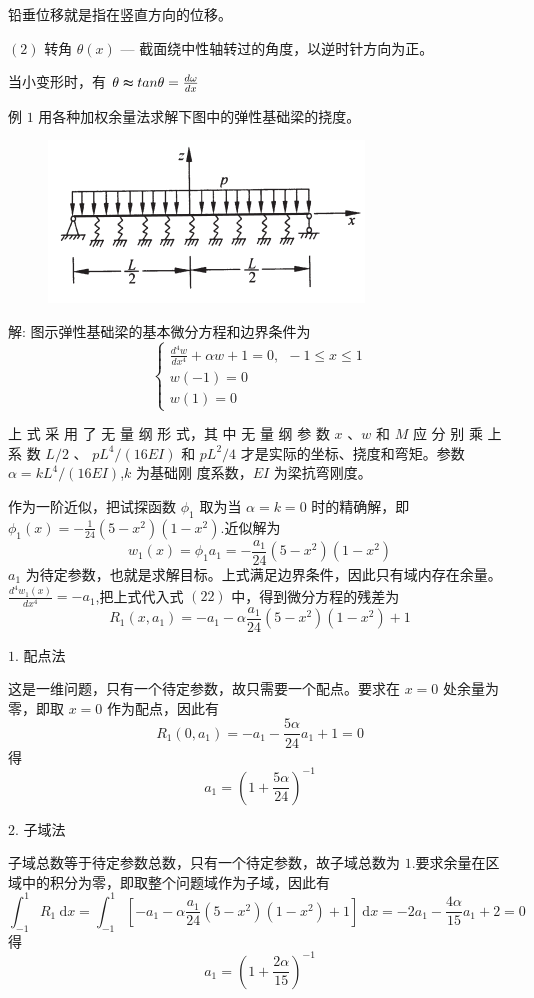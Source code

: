 \documentclass[12pt,a4paper]{article}
\begin{document}
铅垂位移就是指在竖直方向的位移。

$(2)$ 转角 $\theta(x)$ — 截面绕中性轴转过的角度，以逆时针方向为正。

当小变形时，有 $\theta\thickapprox tan\theta =\frac{d\omega}{dx}$

例 $1$ 用各种加权余量法求解下图中的弹性基础梁的挠度。
\begin{figure}[H]
\centering
\includegraphics[scale=0.6]{./figures/1.png}
\caption{}
\end{figure}

解: 图示弹性基础梁的基本微分方程和边界条件为
\begin{equation}
\begin{cases}
\frac{d^4w}{dx^4}+\alpha w+1=0,~~-1\leqslant x\leqslant 1 \\
w(-1)=0 \\
w(1)=0
\end{cases}
\end{equation}

上 式 采 用 了 无 量 纲 形 式，其 中 无 量 纲 参 数 $x$ 、$w$ 和 $M$ 应 分 别 乘 上 系 数 $L/2$ 、
$pL^4/(16EI)$ 和 $pL^2/4$ 才是实际的坐标、挠度和弯矩。参数 $\alpha = kL^4/(16EI)$,$k$ 为基础刚
度系数，$EI$ 为梁抗弯刚度。

作为一阶近似，把试探函数 $\phi_1$ 取为当 $\alpha = k = 0$ 时的精确解，即 $\phi_1(x)= −\frac{1}{24}(5-x^2)(1−x^2)$.近似解为
$$
w_1(x)=\phi_1a_1= −\frac{a_1}{24}(5-x^2)(1−x^2)
$$
$a_1$ 为待定参数，也就是求解目标。上式满足边界条件，因此只有域内存在余量。$\frac{d^4 w_1(x)}{dx^4}=-a_1$,把上式代入式 $(22)$ 中，得到微分方程的残差为
$$
R_1(x,a_1)=-a_1-\alpha\frac{a_1}{24}(5-x^2)(1−x^2)+1
$$

$1$. 配点法

这是一维问题，只有一个待定参数，故只需要一个配点。要求在 $x=0$ 处余量为零，即取 $x=0$ 作为配点，因此有
$$
R_1(0,a_1)=-a_1-\frac{5\alpha}{24}a_1+1=0
$$
得
$$
a_1=(1+\frac{5\alpha}{24})^{-1}
$$

$2$. 子域法

子域总数等于待定参数总数，只有一个待定参数，故子域总数为 $1$.要求余量在区域中的积分为零，即取整个问题域作为子域，因此有
$$
\int_{-1}^{1} R_1 ~\mathrm{d}x=\int_{-1}^{1} \left[-a_1-\alpha\frac{a_1}{24}(5-x^2)(1−x^2)+1\right] ~\mathrm{d}x=-2a_1-\frac{4\alpha}{15}a_1+2=0
$$
得
$$
a_1=(1+\frac{2\alpha}{15})^{-1}
$$
\end{document}
